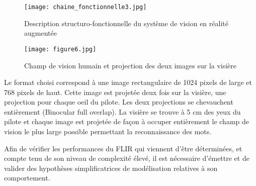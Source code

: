 \begin{figure}[!htb]
\begin{center}
\texttt{[image: chaine\_fonctionnelle3.jpg]}
\caption{Description structuro-fonctionnelle du système de vision en réalité augmentée \label{chaine_fonctionnelle}}
\end{center}
\end{figure}


\begin{figure}[!htb]
\begin{center}
\texttt{[image: figure6.jpg]}
\caption{Champ de vision humain et projection des deux images sur la visière \label{figure6}}
\end{center}
\end{figure}

Le format choisi correspond à une image rectangulaire de 1024 pixels de large et 768 pixels de haut. Cette image
est projetée deux fois sur la visière, une projection pour chaque oeil du pilote. Les deux projections se chevauchent
entièrement (Binocular full overlap). La visière se trouve à 5 cm des yeux du pilote et chaque image est projetée
de façon à occuper entièrement le champ de vision le plus large possible permettant la reconnaissance des mots.




Afin de vérifier les performances du FLIR qui viennent d'être déterminées, et compte tenu de son niveau de
complexité élevé, il est nécessaire d'émettre et de valider des hypothèses simplificatrices de modélisation relatives
à son comportement.
